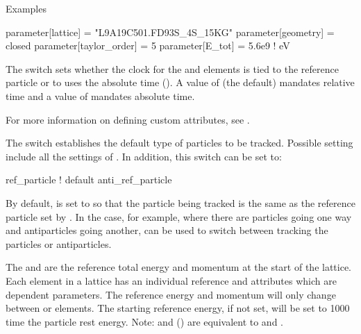 \noindent
Examples
\begin{example}
  parameter[lattice]      = "L9A19C501.FD93S_4S_15KG"
  parameter[geometry]     = closed
  parameter[taylor_order] = 5
  parameter[E_tot]        = 5.6e9    ! eV
\end{example}

  \begin{description}
  \item[{parameter[absolute_time_tracking]}] \Newline
The  switch sets whether the clock for the
 and  elements is tied to the reference
particle or to uses the absolute time (). A value of
 (the default) mandates relative time and a value of
 mandates absolute time.
  \item[{parameter[custom_attributeN]}] \Newline
For more information on defining custom attributes, see .
  \item[{parameter[default_tracking_species]}] \Newline
The  switch establishes the
default type of particles to be tracked. Possible setting include
all the settings of . In addition, 
this switch can be set to:
\begin{example}
  ref_particle     ! default
  anti_ref_particle
\end{example}
By default,  is set to 
so that the particle being tracked is the same as the reference
particle set by . In the case, for example,
where there are particles going one way and antiparticles going another,
 can be used to switch between
tracking the particles or antiparticles.
  \item[{parameter[e_tot], parameter[p0c]}] \Newline
The  and  are the reference
total energy and momentum at the start of the lattice. Each element
in a lattice has an individual reference  and  attributes
which are dependent parameters. The reference energy and momentum will only
change between  or  elements. The starting
reference energy, if not set, will be set to 1000 time the particle
rest energy.  Note:  and  () are
equivalent to  and .

\end{description}
